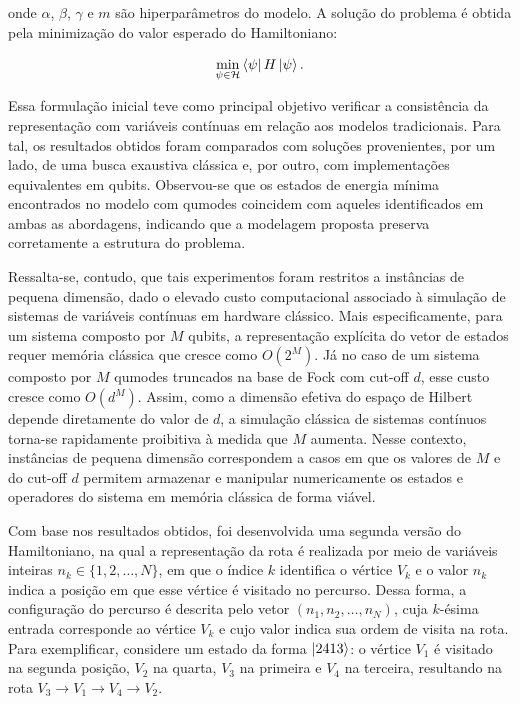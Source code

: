 onde $\alpha$, $\beta$, $\gamma$ e $m$ são hiperparâmetros do modelo. A solução do problema é obtida pela minimização do valor esperado do Hamiltoniano:

\begin{equation}
\min_{\psi \in \mathcal{H}} \bra{\psi} H \ket{\psi}.
\end{equation}

Essa formulação inicial teve como principal objetivo verificar a consistência da representação com variáveis contínuas em relação aos modelos tradicionais. Para tal, os resultados obtidos foram comparados com soluções provenientes, por um lado, de uma busca exaustiva clássica e, por outro, com implementações equivalentes em qubits. Observou-se que os estados de energia mínima encontrados no modelo com qumodes coincidem com aqueles identificados em ambas as abordagens, indicando que a modelagem proposta preserva corretamente a estrutura do problema. 

Ressalta-se, contudo, que tais experimentos foram restritos a instâncias de pequena dimensão, dado o elevado custo computacional associado à simulação de sistemas de variáveis contínuas em hardware clássico.
Mais especificamente, para um sistema composto por $M$ qubits, a representação explícita do vetor de estados requer memória clássica que cresce como $O(2^M)$. Já no caso de um sistema composto por $M$ qumodes truncados na base de Fock com cut-off $d$, esse custo cresce como \(O(d^M)\). Assim, como a dimensão efetiva do espaço de Hilbert depende diretamente do valor de $d$, a simulação clássica de sistemas contínuos torna-se rapidamente proibitiva à medida que $M$ aumenta. Nesse contexto, instâncias de pequena dimensão correspondem a casos em que os valores de $M$ e do cut-off $d$ permitem armazenar e manipular numericamente os estados e operadores do sistema em memória clássica de forma viável.

Com base nos resultados obtidos, foi desenvolvida uma segunda versão do 
Hamiltoniano, na qual a representação da rota é realizada por meio de 
variáveis inteiras $n_k \in \{1,2,\dots,N\}$, em que o índice $k$ 
identifica o vértice $V_k$ e o valor $n_k$ indica a posição em que esse 
vértice é visitado no percurso. Dessa forma, a configuração do percurso 
é descrita pelo vetor $(n_1, n_2, \dots, n_N)$, cuja $k$-ésima entrada 
corresponde ao vértice $V_k$ e cujo valor indica sua ordem de visita na 
rota. Para exemplificar, considere um estado da forma $\ket{2413}$: o 
vértice $V_1$ é visitado na segunda posição, $V_2$ na quarta, $V_3$ na 
primeira e $V_4$ na terceira, resultando na rota $V_3\rightarrow 
V_1\rightarrow V_4\rightarrow V_2$.

